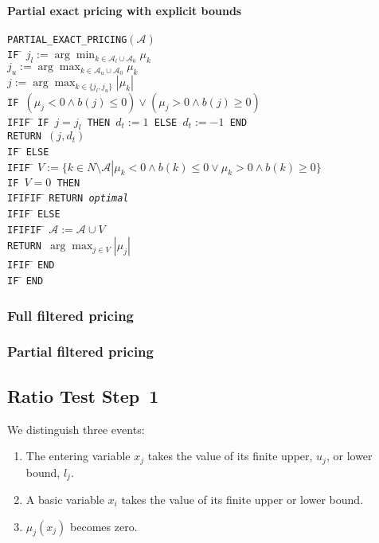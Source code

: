 \documentclass[a4paper]{article}
\begin{document}
\paragraph{Partial exact pricing with explicit bounds}
\begin{tabbing}
\texttt{PARTIAL\_EXACT\_PRICING$(\mathcal{A})$} \\
\texttt{IF} \= \kill
\> \texttt{$j_{l}:=\arg\min_{k \in \mathcal{A}_{l} \cup
                               \mathcal{A}_{0}}\mu_{k}$}  \\
\> \texttt{$j_{u}:=\arg\max_{k \in \mathcal{A}_{u} \cup
                               \mathcal{A}_{0}}\mu_{k}$}  \\
\> \texttt{$j:=\arg\max_{k \in \{j_{l}, j_{u}\}}\left|\mu_{k}\right|$}  \\
\> \texttt{IF $\left(\mu_{j} < 0 \wedge b\left(j\right) \leq 0 \right)
   \vee \left(\mu_{j} > 0 \wedge b\left(j\right) \geq 0 \right)$} \\
\texttt{IFIF} \= \kill
\> \texttt{IF $j=j_{l}$ THEN $d_{t}:=1$ ELSE $d_{t}:=-1$ END} \\
\> \texttt{RETURN $(j, d_{t})$} \\
\texttt{IF} \= \kill
\> \texttt{ELSE} \\
\texttt{IFIF} \= \kill
\> \texttt{$V:=\{k \in N \setminus \mathcal{A} \left|\right.
    \mu_{k} < 0 \wedge b\left(k\right) \leq 0 \vee
    \mu_{k} > 0 \wedge b\left(k\right) \geq 0\}$} \\
\> \texttt{IF $V=0$ THEN} \\
\texttt{IFIFIF} \= \kill  
\> \texttt{RETURN \emph{optimal}} \\
\texttt{IFIF} \= \kill
\> \texttt{ELSE} \\
\texttt{IFIFIF} \= \kill
\> \texttt{$\mathcal{A}:=\mathcal{A} \cup V$} \\
\> \texttt{RETURN $\arg\max_{j \in V}\left|\mu_{j}\right|$} \\
\texttt{IFIF} \= \kill
\> \texttt{END} \\
\texttt{IF} \= \kill
\> \texttt{END}
\end{tabbing}
\subsubsection{Full filtered pricing}
\subsubsection{Partial filtered pricing}

\subsection{Ratio Test Step~1}
We distinguish three events:
\begin{enumerate}
\item The entering variable $x_{j}$ takes the value of its finite upper,
$u_{j}$, or lower bound, $l_{j}$.
\item A basic variable $x_{i}$ takes the value of its finite upper or lower bound.
\item $\mu_{j}(x_{j})$ becomes zero.
\end{enumerate}
\end{document}
